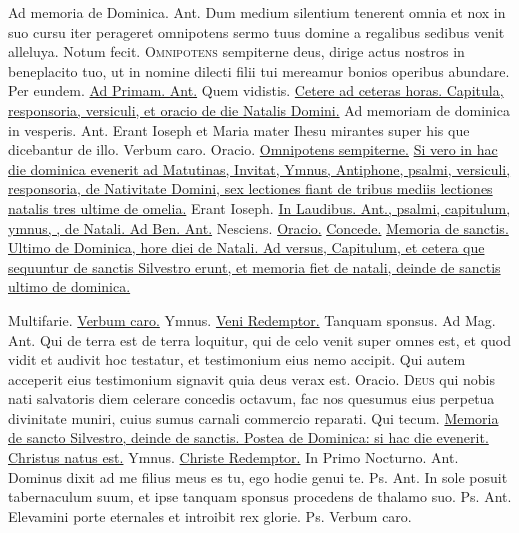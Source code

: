 \begin{multicols*}{2}
{\color{Red} Ad memoria de Dominica. Ant.} Dum medium silentium tenerent omnia et nox in suo cursu iter perageret omnipotens sermo tuus domine a regalibus sedibus venit alleluya. \V Notum fecit.
\lettrine[lines=2]{\zallmancaps \color{Red} O}{mnipotens} \hypertarget{omnipotens-nativitas}{sempiterne} deus, dirige actus nostros in beneplacito tuo, ut in nomine dilecti filii tui mereamur bonios operibus abundare. Per eundem.
\newline \ul{Ad Primam. Ant.} Quem vidistis. \ul{Cetere ad ceteras horas. Capitula, responsoria, versiculi, et oracio de die Natalis Domini.}
{\color{Red} Ad memoriam de dominica in vesperis. Ant.} Erant Ioseph et Maria mater Ihesu mirantes super his que dicebantur de illo. \V Verbum caro. Oracio. \hyperlink{omnipotens-nativitas}{Omnipotens sempiterne.} \ul{Si vero in hac die dominica evenerit ad Matutinas, Invitat, Ymnus, Antiphone, psalmi, versiculi, responsoria, de Nativitate Domini, sex lectiones fiant de tribus mediis lectiones natalis tres ultime de omelia.} Erant Ioseph. \ul{In Laudibus. Ant., psalmi, capitulum, ymnus, \Vbar , de Natali. Ad Ben. Ant.} Nesciens. \ul{Oracio.} \hyperlink{concede-nativitas}{Concede.} \ul{Memoria de sanctis. Ultimo de Dominica, hore diei de Natali. Ad versus, Capitulum, et cetera que sequuntur de sanctis Silvestro erunt, et memoria fiet de natali, deinde de sanctis ultimo de dominica.}
{\color{Red} }
\par {} Multifarie. \R \hyperlink{verbum-caro-factum-doxology}{Verbum caro.} {\color{Red} Ymnus.} \hyperlink{veni-redemptor}{Veni Redemptor.} \V Tanquam sponsus. {\color{Red} Ad Mag. Ant.} Qui de terra est de terra loquitur, qui de celo venit super omnes est, et quod vidit et audivit hoc testatur, et testimonium eius nemo accipit. Qui autem acceperit eius testimonium signavit quia deus verax est. {\color{Red} Oracio.}
\lettrine[lines=2]{\zallmancaps \color{Blue} D}{eus} \hypertarget{deus-nobis-circumcisionis}{qui} nobis nati salvatoris diem celerare concedis octavum, fac nos quesumus eius perpetua divinitate muniri, cuius sumus carnali commercio reparati. Qui tecum. \ul{Memoria de sancto Silvestro, deinde de sanctis. Postea de Dominica: si hac die evenerit.}
 \hyperlink{christus-natus-invitatorium}{Christus natus est.} {\color{Red} Ymnus.} \hyperlink{christe-redemptor}{Christe Redemptor.} {\color{Red} In Primo Nocturno. Ant.} \hypertarget{ant-dominus-dixit}{Dominus} dixit ad me filius meus es tu, ego hodie genui te. {\color{Red} Ps.}  {\color{Red} Ant.} In sole posuit tabernaculum suum, et ipse tanquam sponsus procedens de thalamo suo. {\color{Red} Ps.}  {\color{Red} Ant.} Elevamini porte eternales et introibit rex glorie. {\color{Red} Ps.}  \V Verbum caro.

\end{multicols*}
